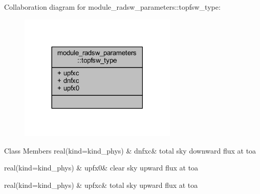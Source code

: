 Collaboration diagram for module\+\_\+radsw\+\_\+parameters\+:\+:topfsw\+\_\+type\+:\nopagebreak
\begin{figure}[H]
\begin{center}
\leavevmode
\includegraphics[width=213pt]{structmodule__radsw__parameters_1_1topfsw__type__coll__graph}
\end{center}
\end{figure}
\begin{DoxyFields}{Class Members}
real(kind=kind\+\_\+phys)\hypertarget{group__module__radsw__main_gac1466bb6a9da92a59bdef51439320f35}{}\label{group__module__radsw__main_gac1466bb6a9da92a59bdef51439320f35}
&
dnfxc&
total sky downward flux at toa \\
\hline

real(kind=kind\+\_\+phys)\hypertarget{group__module__radsw__main_ga992c82c935dcb4d6269c905fc184cf48}{}\label{group__module__radsw__main_ga992c82c935dcb4d6269c905fc184cf48}
&
upfx0&
clear sky upward flux at toa \\
\hline

real(kind=kind\+\_\+phys)\hypertarget{group__module__radsw__main_ga444a7fd67ff2c22403779a5e83eef09b}{}\label{group__module__radsw__main_ga444a7fd67ff2c22403779a5e83eef09b}
&
upfxc&
total sky upward flux at toa \\
\hline

\end{DoxyFields}
